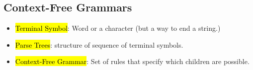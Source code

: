 \subsection{Context-Free Grammars}
\begin{itemize}
    \item \hl{Terminal Symbol}: Word or a character (but a way to end a string.)
    \item \hl{Parse Trees}:  structure of sequence of terminal symbols.
    \item \hl{Context-Free Grammar}: Set of rules that specify which children are possible. 
\end{itemize}